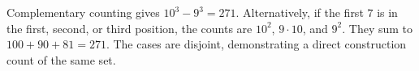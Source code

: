Complementary counting gives $10^3-9^3=\boxed{271}$. Alternatively, if the first $7$ is in the first, second, or third position, the counts are $10^2$, $9\cdot10$, and $9^2$. They sum to $100+90+81=271$. The cases are disjoint, demonstrating a direct construction count of the same set.
